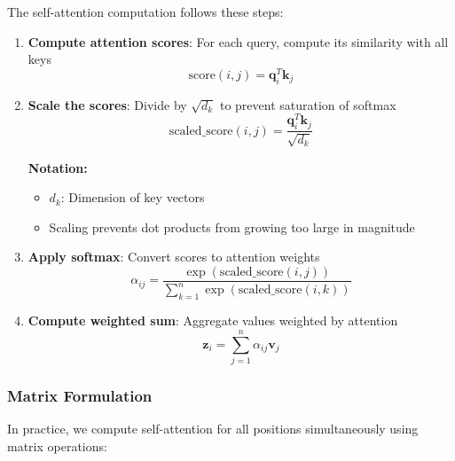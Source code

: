 \documentclass[11pt]{article}
\begin{document}
The self-attention computation follows these steps:

\begin{enumerate}
    \item \textbf{Compute attention scores}: For each query, compute its similarity with all keys
    \begin{equation}
    \text{score}(i,j) = \mathbf{q}_i^T \mathbf{k}_j
    \end{equation}
    
    \item \textbf{Scale the scores}: Divide by $\sqrt{d_k}$ to prevent saturation of softmax
    \begin{equation}
    \text{scaled\_score}(i,j) = \frac{\mathbf{q}_i^T \mathbf{k}_j}{\sqrt{d_k}}
    \end{equation}
    \begin{notationbox}
    \textbf{Notation:}
    \begin{itemize}
        \item $d_k$: Dimension of key vectors
        \item Scaling prevents dot products from growing too large in magnitude
    \end{itemize}
    \end{notationbox}
    
    \item \textbf{Apply softmax}: Convert scores to attention weights
    \begin{equation}
    \alpha_{ij} = \frac{\exp(\text{scaled\_score}(i,j))}{\sum_{k=1}^{n} \exp(\text{scaled\_score}(i,k))}
    \end{equation}
    
    \item \textbf{Compute weighted sum}: Aggregate values weighted by attention
    \begin{equation}
    \mathbf{z}_i = \sum_{j=1}^{n} \alpha_{ij} \mathbf{v}_j
    \end{equation}
\end{enumerate}

\subsubsection{Matrix Formulation}

In practice, we compute self-attention for all positions simultaneously using matrix operations:
\end{document}
